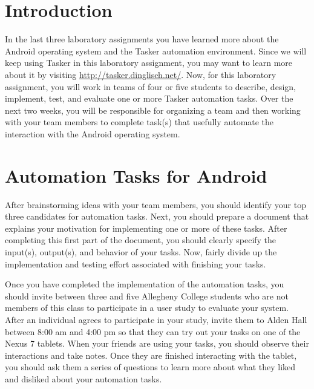 


\usepackage[compact]{titlesec}



\section*{Introduction}

In the last three laboratory assignments you have learned more about the Android operating system and the Tasker
automation environment. Since we will keep using Tasker in this laboratory assignment, you may want to learn more about
it by visiting \url{http://tasker.dinglisch.net/}.  Now, for this laboratory assignment, you will work in teams of four
or five students to describe, design, implement, test, and evaluate one or more Tasker automation tasks.  Over the next
two weeks, you will be responsible for organizing a team and then working with your team members to complete task(s)
that usefully automate the interaction with the Android operating system.

\section*{Automation Tasks for Android}

After brainstorming ideas with your team members, you should identify your top three candidates for automation tasks.
Next, you should prepare a document that explains your motivation for implementing one or more of these tasks.  After
completing this first part of the document, you should clearly specify the input(s), output(s), and behavior of your
tasks. Now, fairly divide up the implementation and testing effort associated with finishing your tasks. 

Once you have completed the implementation of the automation tasks, you should invite between three and five Allegheny
College students who are not members of this class to participate in a user study to evaluate your system.  After an
individual agrees to participate in your study, invite them to Alden Hall between 8:00 am and 4:00 pm so that they can
try out your tasks on one of the Nexus 7 tablets. When your friends are using your tasks, you should observe their
interactions and take notes.  Once they are finished interacting with the tablet, you should ask them a series of
questions to learn more about what they liked and disliked about your automation tasks.  

